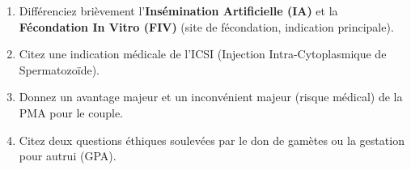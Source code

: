 \documentclass[11pt]{article}
\begin{document}
\begin{exercice}
\begin{enumerate}
    \item Différenciez brièvement l'\textbf{Insémination Artificielle (IA)} et la \textbf{Fécondation In Vitro (FIV)} (site de fécondation, indication principale).
    \item Citez une indication médicale de l'ICSI (Injection Intra-Cytoplasmique de Spermatozoïde).
    \item Donnez un avantage majeur et un inconvénient majeur (risque médical) de la PMA pour le couple.
    \item Citez deux questions éthiques soulevées par le don de gamètes ou la gestation pour autrui (GPA).
\end{enumerate}
\end{exercice}
\end{document}
